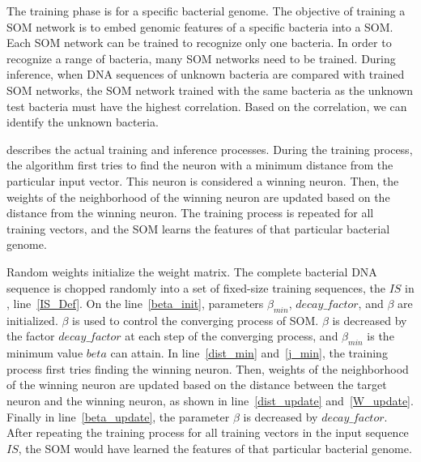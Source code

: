 The training phase is for a specific bacterial genome. The objective of training a SOM network is to embed genomic features of a specific bacteria into a SOM. Each SOM network can be trained to recognize only one bacteria. In order to recognize a range of bacteria, many SOM networks need to be trained. During inference, when DNA sequences of unknown bacteria are compared with trained SOM networks, the SOM network trained with the same bacteria as the unknown test bacteria must have the highest correlation. Based on the correlation, we can identify the unknown bacteria. 

 describes the actual training and inference processes. During the training process, the algorithm first tries to find the neuron with a minimum distance from the particular input vector. This neuron is considered a winning neuron. Then, the weights of the neighborhood of the winning neuron are updated based on the distance from the winning neuron. The training process is repeated for all training vectors, and the SOM learns the features of that particular bacterial genome.

Random weights initialize the weight matrix. The complete bacterial DNA sequence is chopped randomly into a set of fixed-size training sequences, the $IS$ in , line~\ref{IS_Def}. On the line~\ref{beta_init}, parameters $\beta_{min}$, $decay\_factor$, and $\beta$ are initialized. $\beta$ is used to control the converging process of SOM. $\beta$ is decreased by the factor $decay\_factor$ at each step of the converging process, and $\beta_{min}$ is the minimum value $beta$ can attain. In line~\ref{dist_min} and~\ref{j_min}, the training process first tries finding the winning neuron. Then, weights of the neighborhood of the winning neuron are updated based on the distance between the target neuron and the winning neuron, as shown in line~\ref{dist_update} and~\ref{W_update}. Finally in line~\ref{beta_update}, the parameter $\beta$ is decreased by $decay\_factor$. After repeating the training process for all training vectors in the input sequence $IS$, the SOM would have learned the features of that particular bacterial genome. 

